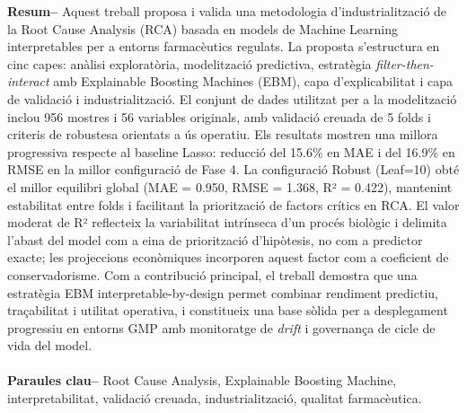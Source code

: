\documentclass[10pt,a4paper,twocolumn,twoside]{article}
\begin{document}
\begin{@twocolumnfalse}
\begin{center}
\parbox{0.915\textwidth}
{\sffamily
\textbf{Resum--}
Aquest treball proposa i valida una metodologia d'industrialització de la Root Cause Analysis (RCA) basada en models de Machine Learning interpretables per a entorns farmacèutics regulats. La proposta s'estructura en cinc capes: anàlisi exploratòria, modelització predictiva, estratègia \emph{filter-then-interact} amb Explainable Boosting Machines (EBM), capa d'explicabilitat i capa de validació i industrialització. El conjunt de dades utilitzat per a la modelització inclou 956 mostres i 56 variables originals, amb validació creuada de 5 folds i criteris de robustesa orientats a ús operatiu. Els resultats mostren una millora progressiva respecte al baseline Lasso: reducció del 15.6\% en MAE i del 16.9\% en RMSE en la millor configuració de Fase 4. La configuració Robust (Leaf=10) obté el millor equilibri global (MAE = 0.950, RMSE = 1.368, R² = 0.422), mantenint estabilitat entre folds i facilitant la priorització de factors crítics en RCA. El valor moderat de R² reflecteix la variabilitat intrínseca d'un procés biològic i delimita l'abast del model com a eina de priorització d'hipòtesis, no com a predictor exacte; les projeccions econòmiques incorporen aquest factor com a coeficient de conservadorisme. Com a contribució principal, el treball demostra que una estratègia EBM interpretable-by-design permet combinar rendiment predictiu, traçabilitat i utilitat operativa, i constitueix una base sòlida per a desplegament progressiu en entorns GMP amb monitoratge de \emph{drift} i governança de cicle de vida del model.
\\
\\
\textbf{Paraules clau-- } Root Cause Analysis, Explainable Boosting Machine, interpretabilitat, validació creuada, industrialització, qualitat farmacèutica.\\
\\
\bigskip
\\
}
\end{center}
\end{@twocolumnfalse}
\end{document}

